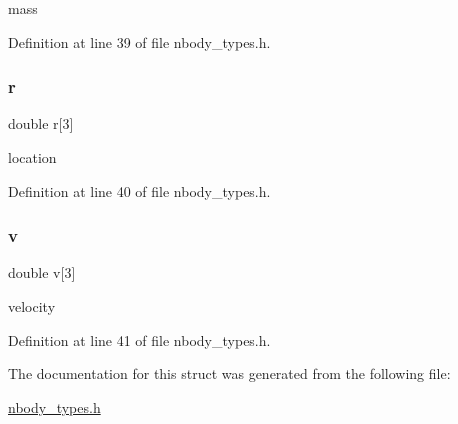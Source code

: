 mass 

Definition at line 39 of file nbody\+\_\+types.\+h.

\hypertarget{struct_body_a32028928bab6f6e926f89bf7c52c4138}{}\label{struct_body_a32028928bab6f6e926f89bf7c52c4138} 
\subsubsection{\texorpdfstring{r}{r}}
{\footnotesize\ttfamily double r\mbox{[}3\mbox{]}}

location 

Definition at line 40 of file nbody\+\_\+types.\+h.

\hypertarget{struct_body_ad8b2664bf7d7db7f9685845624616041}{}\label{struct_body_ad8b2664bf7d7db7f9685845624616041} 
\subsubsection{\texorpdfstring{v}{v}}
{\footnotesize\ttfamily double v\mbox{[}3\mbox{]}}

velocity 

Definition at line 41 of file nbody\+\_\+types.\+h.



The documentation for this struct was generated from the following file\+:\begin{DoxyCompactItemize}
\item 
\hyperlink{nbody__types_8h}{nbody\+\_\+types.\+h}\end{DoxyCompactItemize}
